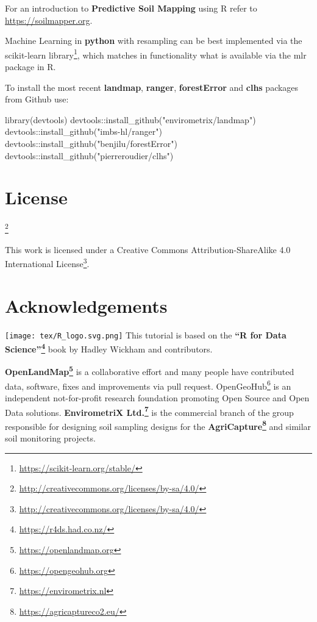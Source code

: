 \documentclass[
  graybox,natbib,nospthms]{svmono}
\newenvironment{Shaded}{\begin{snugshade}}{\end{snugshade}}
\newcommand{\FunctionTok}[1]{\textcolor[rgb]{0,0,0}{#1}}
\newcommand{\NormalTok}[1]{#1}
\newcommand{\SpecialCharTok}[1]{\textcolor[rgb]{0,0,0}{#1}}
\newcommand{\StringTok}[1]{\textcolor[rgb]{0.5,0.5,0.5}{#1}}
\renewcommand{\href}[2]{#2 (\url{#1})}
\renewcommand{\href}[2]{#2\footnote{\url{#1}}}
\begin{document}
For an introduction to \textbf{Predictive Soil Mapping} using R refer to \url{https://soilmapper.org}.

Machine Learning in \textbf{python} with resampling can be best implemented via the \href{https://scikit-learn.org/stable/}{scikit-learn library},
which matches in functionality what is available via the mlr package in R.

To install the most recent \textbf{landmap}, \textbf{ranger}, \textbf{forestError} and \textbf{clhs} packages from Github use:

\begin{Shaded}
\begin{Highlighting}[]
\FunctionTok{library}\NormalTok{(devtools)}
\NormalTok{devtools}\SpecialCharTok{::}\FunctionTok{install\_github}\NormalTok{(}\StringTok{"envirometrix/landmap"}\NormalTok{)}
\NormalTok{devtools}\SpecialCharTok{::}\FunctionTok{install\_github}\NormalTok{(}\StringTok{"imbs{-}hl/ranger"}\NormalTok{)}
\NormalTok{devtools}\SpecialCharTok{::}\FunctionTok{install\_github}\NormalTok{(}\StringTok{"benjilu/forestError"}\NormalTok{)}
\NormalTok{devtools}\SpecialCharTok{::}\FunctionTok{install\_github}\NormalTok{(}\StringTok{"pierreroudier/clhs"}\NormalTok{)}
\end{Highlighting}
\end{Shaded}

\hypertarget{license}{%
\section*{License}\label{license}}

\href{http://creativecommons.org/licenses/by-sa/4.0/}{}

This work is licensed under a \href{http://creativecommons.org/licenses/by-sa/4.0/}{Creative Commons Attribution-ShareAlike 4.0 International License}.

\hypertarget{acknowledgements}{%
\section*{Acknowledgements}\label{acknowledgements}}

\texttt{[image: tex/R\_logo.svg.png]} This tutorial is based on the \textbf{\href{https://r4ds.had.co.nz/}{``R for Data Science''}} book by Hadley Wickham and contributors.

\textbf{\href{https://openlandmap.org}{OpenLandMap}} is a collaborative effort and many people
have contributed data, software, fixes and improvements via pull request. \href{https://opengeohub.org}{OpenGeoHub}
is an independent not-for-profit research foundation promoting Open Source and Open Data solutions.
\textbf{\href{https://envirometrix.nl}{EnvirometriX Ltd.}} is the commercial branch of the group
responsible for designing soil sampling designs for the \textbf{\href{https://agricaptureco2.eu/}{AgriCapture}} and similar soil monitoring projects.
\end{document}
